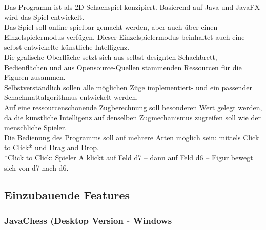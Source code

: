 \documentclass[12pt,a4paper]{article}
\begin{document}
{Das Programm ist als 2D Schachspiel konzipiert. Basierend auf Java und JavaFX wird das Spiel entwickelt. \\
Das Spiel soll online spielbar gemacht werden, aber auch über einen Einzelspielermodus verfügen. Dieser Einzelspielermodus beinhaltet auch eine selbst entwickelte künstliche Intelligenz. \\
Die grafische Oberfläche setzt sich aus selbst designten Schachbrett, Bedienflächen und aus Opensource-Quellen stammenden Ressourcen für die Figuren zusammen.\\
Selbstverständlich sollen alle möglichen Züge implementiert- und ein passender Schachmattalgorithmus entwickelt werden. \\
Auf eine ressourcenschonende Zugberechnung soll besonderen Wert gelegt werden, da die künstliche Intelligenz auf denselben Zugmechanismus zugreifen soll wie der menschliche Spieler. \\
Die Bedienung des Programms soll auf mehrere Arten möglich sein:  mittels Click to Click* und Drag and Drop.\\
*Click to Click: Spieler A klickt auf Feld d7 – dann auf Feld d6 – Figur bewegt sich von d7 nach d6.

\subsection{Einzubauende Features}

\subsubsection{JavaChess (Desktop Version - Windows}

}
\end{document}
